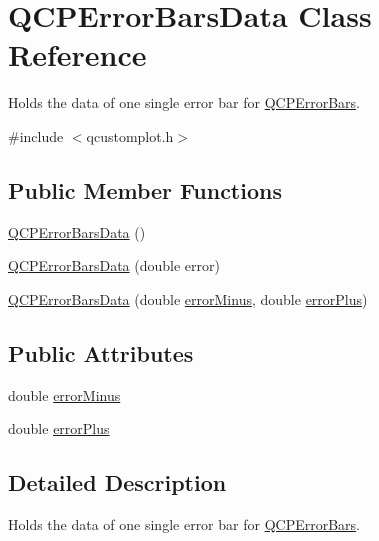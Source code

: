\hypertarget{class_q_c_p_error_bars_data}{}\section{Q\+C\+P\+Error\+Bars\+Data Class Reference}
\label{class_q_c_p_error_bars_data}


Holds the data of one single error bar for \mbox{\hyperlink{class_q_c_p_error_bars}{Q\+C\+P\+Error\+Bars}}.  




{\ttfamily \#include $<$qcustomplot.\+h$>$}

\subsection*{Public Member Functions}
\begin{DoxyCompactItemize}
\item 
\mbox{\hyperlink{class_q_c_p_error_bars_data_ac18bdb46dec56f8df7f3c99d058cc725}{Q\+C\+P\+Error\+Bars\+Data}} ()
\item 
\mbox{\hyperlink{class_q_c_p_error_bars_data_a73ebdaa55fa7f0052b70895b28edb444}{Q\+C\+P\+Error\+Bars\+Data}} (double error)
\item 
\mbox{\hyperlink{class_q_c_p_error_bars_data_a7c61e42d87aea3312262d5429bc28387}{Q\+C\+P\+Error\+Bars\+Data}} (double \mbox{\hyperlink{class_q_c_p_error_bars_data_af8aaea160e52c14c57836224ee78020b}{error\+Minus}}, double \mbox{\hyperlink{class_q_c_p_error_bars_data_ad1283c99fbfccf37a0226b1df52f0776}{error\+Plus}})
\end{DoxyCompactItemize}
\subsection*{Public Attributes}
\begin{DoxyCompactItemize}
\item 
double \mbox{\hyperlink{class_q_c_p_error_bars_data_af8aaea160e52c14c57836224ee78020b}{error\+Minus}}
\item 
double \mbox{\hyperlink{class_q_c_p_error_bars_data_ad1283c99fbfccf37a0226b1df52f0776}{error\+Plus}}
\end{DoxyCompactItemize}


\subsection{Detailed Description}
Holds the data of one single error bar for \mbox{\hyperlink{class_q_c_p_error_bars}{Q\+C\+P\+Error\+Bars}}. 

